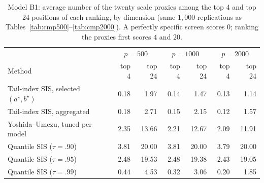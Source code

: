 \begin{table}[t]
\centering
\caption{Model B1: average number of the twenty scale proxies among the top 4 and top 24 positions of each ranking, by dimension (same $1{,}000$ replications as Tables~\ref{tab:cmp500}--\ref{tab:cmp2000}). A perfectly specific screen scores $0$; ranking the proxies first scores $4$ and $20$.}
\label{tab:b1comp}
\begin{tabular}{lrrrrrr}
\toprule
 & \multicolumn{2}{c}{$p=500$} & \multicolumn{2}{c}{$p=1000$}
 & \multicolumn{2}{c}{$p=2000$}\\
Method & top 4 & top 24 & top 4 & top 24 & top 4 & top 24\\
\midrule
Tail-index SIS, selected $(a^\star,b^\star)$ & 0.18 & 1.97 & 0.14 & 1.47 & 0.13 & 1.14\\
Tail-index SIS, aggregated & 0.18 & 2.71 & 0.15 & 2.15 & 0.12 & 1.57\\
Yoshida--Umezu, tuned per model & 2.35 & 13.66 & 2.21 & 12.67 & 2.09 & 11.91\\
Quantile SIS ($\tau=.90$) & 3.81 & 20.00 & 3.81 & 20.00 & 3.79 & 20.00\\
Quantile SIS ($\tau=.95$) & 2.48 & 19.53 & 2.48 & 19.38 & 2.43 & 19.05\\
Quantile SIS ($\tau=.99$) & 0.44 & 4.53 & 0.32 & 3.06 & 0.20 & 1.85\\
\bottomrule
\end{tabular}
\end{table}

